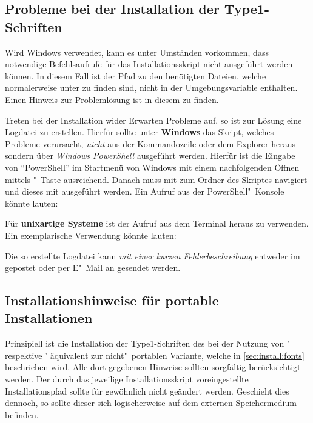\subsection{Probleme bei der Installation der Type1-Schriften}
%
Wird Windows verwendet, kann es unter Umständen vorkommen, dass notwendige 
Befehlsaufrufe für das Installationsskript nicht ausgeführt werden können. In 
diesem Fall ist der Pfad zu den benötigten Dateien, welche normalerweise unter 
 zu finden sind, nicht in der 
Umgebungsvariable  enthalten. Einen Hinweis zur Problemlösung ist 
in diesem  zu finden.

Treten bei der Installation wider Erwarten Probleme auf, so ist zur Lösung eine 
Logdatei zu erstellen. Hierfür sollte unter \textbf{Windows} das Skript, 
welches Probleme verursacht, \emph{nicht} aus der Kommandozeile oder dem 
Explorer heraus sondern über \emph{Windows PowerShell} ausgeführt werden. 
Hierfür ist die Eingabe von \enquote{PowerShell} im Startmenü von Windows mit 
einem nachfolgenden Öffnen mittels "~Taste ausreichend. 
Danach muss mit  zum Ordner des Skriptes navigiert und dieses mit 
ausgeführt werden. Ein Aufruf aus der PowerShell"~Konsole könnte lauten:
%
\begin{quoting}[rightmargin=0pt]
  \newline%
\end{quoting}
%
Für \textbf{unixartige Systeme} ist der Aufruf 
 aus dem Terminal heraus zu 
verwenden. Ein exemplarische Verwendung könnte lauten:
%
\begin{quoting}
  \newline
\end{quoting}
%
Die so erstellte Logdatei kann \emph{mit einer kurzen Fehlerbeschreibung} 
entweder im \Forum gepostet oder per E"~Mail an \mailto{\TUDScriptContact}
gesendet werden.


\subsection{%
  Installationshinweise für portable Installationen%
  \label{sec:install:portable}%
}
%
Prinzipiell ist die Installation der Type1-Schriften des \CDs bei der Nutzung 
von \TeXLive' respektive \MiKTeX' äquivalent zur nicht"~portablen Variante, 
welche in \autoref{sec:install:fonts} beschrieben wird. Alle dort gegebenen 
Hinweise sollten sorgfältig berücksichtigt werden. Der durch das jeweilige 
Installationsskript voreingestellte Installationspfad sollte für gewöhnlich 
nicht geändert werden. Geschieht dies dennoch, so sollte dieser sich 
logischerweise auf dem externen Speichermedium   
 befinden.

